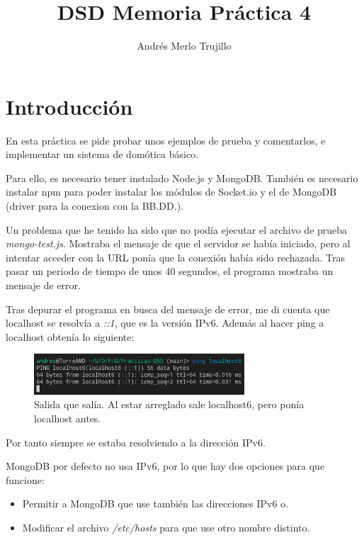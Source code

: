 \documentclass{article}
\title{DSD Memoria Práctica 4}
\author{Andrés Merlo Trujillo}
\date{}
\begin{document}

\maketitle

\tableofcontents

\newpage

\section{Introducción}
En esta práctica se pide probar unos ejemplos de prueba y comentarlos, e implementar un sistema de domótica básico.

Para ello, es necesario tener instalado Node.js y MongoDB. También es necesario instalar npm para poder instalar los módulos de Socket.io y el de MongoDB (driver para la conexion con la BB.DD.).

Un problema que he tenido ha sido que no podía ejecutar el archivo de prueba \textit{mongo-test.js}. Mostraba el mensaje de que el servidor se había iniciado, pero al intentar acceder con la URL ponía que la conexión había sido rechazada. Tras pasar un periodo de tiempo de unos 40 segundos, el programa mostraba un mensaje de error.

Tras depurar el programa en busca del mensaje de error, me di cuenta que localhost se resolvía a \textit{::1}, que es la versión IPv6. Además al hacer ping a localhost obtenía lo siguiente:

\begin{figure}[H]
    \centering
    \includegraphics[width=0.7\textwidth]{images/ping.png}
    \caption{Salida que salía. Al estar arreglado sale localhost6, pero ponía localhost antes.}
\end{figure}

Por tanto siempre se estaba resolviendo a la dirección IPv6.

MongoDB por defecto no usa IPv6, por lo que hay dos opciones para que funcione:

\begin{itemize}
    \item Permitir a MongoDB que use también las direcciones IPv6 o.
    
    \item Modificar el archivo \textit{/etc/hosts} para que use otro nombre distinto.
\end{itemize}
\end{document}
